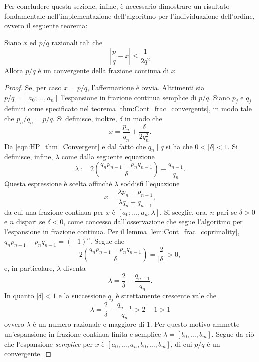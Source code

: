 Per concludere questa sezione, infine, è necessario dimostrare un risultato fondamentale nell'implementazione dell'algoritmo per l'individuazione dell'ordine, ovvero il seguente teorema:
\begin{thm}
 Siano $x$ ed $p/q$ razionali tali che
 \begin{equation}\label{eqn:HP_thm_Convergent}
  \left| \frac{p}{q} - x \right| \leq \frac{1}{2q^2}
 \end{equation}
 Allora $p/q$ è un convergente della frazione continua di $x$
\end{thm}
\begin{proof}
 Se, per caso $x = p/q$, l'affermazione è ovvia.
 Altrimenti sia $p/q = [a_0;\dots, a_n]$ l'espansione in frazione continua semplice di $p/q$.
 Siano $p_j$ e $q_j$ definiti come specificato nel teorema \ref{thm:Cont_frac_convergents}, in modo tale che $p_n/q_n = p/q$.
 Si definisce, inoltre, $\delta$ in modo che
 \begin{equation}
  x = \frac{p_n}{q_n} + \frac{\delta}{2q_n^2}.
 \end{equation}
 Da \eqref{eqn:HP_thm_Convergent} e dal fatto che $q_n \mid q$ si ha che $0 < |\delta| < 1$.
 Si definisce, infine, $\lambda$ come dalla seguente equazione
 \begin{equation}
  \lambda := 2 \left( \frac{q_np_{n-1} - p_nq_{n-1}}{\delta} \right) - \frac{q_{n-1}}{q_n}.
 \end{equation}
 Questa espressione è scelta affinché $\lambda$ soddisfi l'equazione
 \begin{equation}
  x = \frac{\lambda p_n + p_{n-1}}{\lambda q_n + q_{n-1}},
 \end{equation}
 da cui una frazione continua per $x$ è $[a_0;\dots,a_n,\lambda]$.
 Si sceglie, ora, $n$ pari se $\delta > 0$ e $n$ dispari se $\delta < 0$, come concesso dall'osservazione che segue l'algoritmo per l'espansione in frazione continua. Per il lemma \ref{lem:Cont_frac_coprimality}, $q_np_{n-1} - p_nq_{n-1} = (-1)^n$. Segue che 
 \begin{equation}
  2 \left( \frac{q_np_{n-1} - p_nq_{n-1}}{\delta} \right) = \frac{2}{|\delta|} > 0,
 \end{equation}
 e, in particolare, $\lambda$ diventa
 \begin{equation}
  \lambda = \frac{2}{\delta} - \frac{q_{n-1}}{q_n}.
 \end{equation}
 In quanto $|\delta|<1$ e la successione $q_j$ è strettamente crescente vale che
 \begin{equation}
  \lambda = \frac{2}{\delta} - \frac{q_{n-1}}{q_n} > 2 - 1 > 1
 \end{equation}
 ovvero $\lambda$ è un numero razionale e maggiore di 1.
 Per questo motivo ammette un'espansione in frazione continua finita e semplice $\lambda = [b_0, \dots, b_m]$.
 Segue da ciò che l'espansione \textit{semplice} per $x$ è $[a_0, \dots, a_n, b_0, \dots, b_m]$, di cui $p/q$ è un convergente. 
\end{proof}
